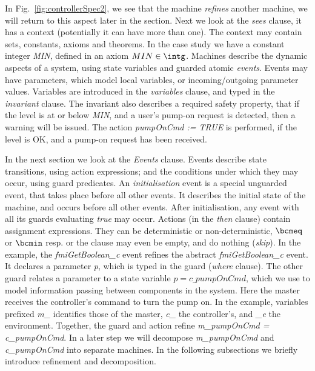 \documentclass{llncs}%
\begin{document}
 In Fig.~\ref{fig:controllerSpec2}, we see that the machine \emph{refines} another machine, we will return to this aspect later in the section. Next we look at the \emph{sees} clause, it has a context (potentially it can have more than one). The context may contain sets, constants, axioms and theorems. In the case study we have a constant integer \emph{MIN}, defined in an axiom $MIN \in \intg$. Machines describe the dynamic aspects of a system, using state variables and guarded atomic \emph{events}. Events may have parameters, which model local variables, or incoming/outgoing parameter values. Variables are introduced in the \emph{variables} clause, and typed in the \emph{invariant} clause. The invariant also describes a required safety property, that if the level is at or below \emph{MIN}, and a user's pump-on request is detected, then a warning will be issued. The action \emph{pumpOnCmd := TRUE} is performed, if the level is OK, and a pump-on request has been received.

In the next section we look at the \emph{Events} clause. Events describe state transitions, using action expressions; and the conditions under which they may occur, using guard predicates. An \emph{initialisation} event is a special unguarded event, that takes place before all other events. It describes the initial state of the machine, and occurs before all other events. After initialisation, any event with all its guards evaluating \emph{true} may occur. Actions (in the \emph{then} clause) contain assignment expressions. They can be deterministic or non-deterministic, $\bcmeq$ or $\bcmin$ resp. or the clause may even be empty, and do nothing (\emph{skip}). In the example, the \emph{fmiGetBoolean\_c} event refines the abstract \emph{fmiGetBoolean\_c} event. It declares a parameter \emph{p}, which is typed in the guard (\emph{where} clause). The other guard relates a parameter to a state variable $p = c\_pumpOnCmd$, which we use to model information passing between components in the system. Here the master receives the controller’s command to turn the pump on. In the example, variables prefixed \emph{m\_} identifies those of the master, \emph{c\_} the controller's, and \emph{\_e} the environment. Together, the guard and action refine \emph{m\_pumpOnCmd = c\_pumpOnCmd}. In a later step we will decompose \emph{m\_pumpOnCmd} and \emph{c\_pumpOnCmd} into separate machines. In the following subsections we briefly introduce refinement and decomposition.
\end{document}
